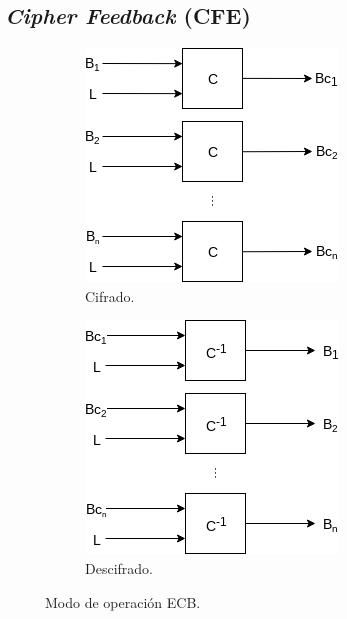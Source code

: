 \subsection{\textit{Cipher Feedback} (CFE)}

\begin{figure}[H]
  \centering
  \begin{subfigure}{0.45\textwidth}
      \begin{center}
          \includegraphics[width=0.7\linewidth]
            {contenidos/antecedentes/diagramas/modo_ecb.png}
          \caption{Cifrado.}
      \end{center}
  \end{subfigure}
  \begin{subfigure}{0.45\textwidth}
      \begin{center}
          \includegraphics[width=0.7\linewidth]
            {contenidos/antecedentes/diagramas/modo_ecb_inverso.png}
          \caption{Descifrado.}
      \end{center}
  \end{subfigure}
  \caption{Modo de operación ECB.}
\end{figure}


